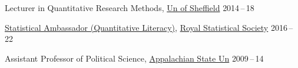 \documentclass[12pt]{article}
\newcommand{\halfblankline}{\quad\vspace{-0.5\baselineskip}\pagebreak[3]}
\begin{document}
Lecturer in Quantitative Research Methods, \href{http://www.sheffield.ac.uk/}{Un of Sheffield} \hfill {2014\,--\,18}

\href{https://rss.org.uk/membership/faq/rss-statistical-ambassadors/#:~:text=The%20RSS%20statistical%20ambassadors%20programme,media%2C%20schools%20and%20wider%20public.}
{Statistical Ambassador (Quantitative Literacy)}, \href{http://www.rss.org.uk/}{Royal Statistical Society}  \hfill {2016\,--\,22}

Assistant Professor of Political Science, \href{http://www.appstate.edu/}{Appalachian State Un} \hfill {2009\,--\,14}


\halfblankline
\end{document}
